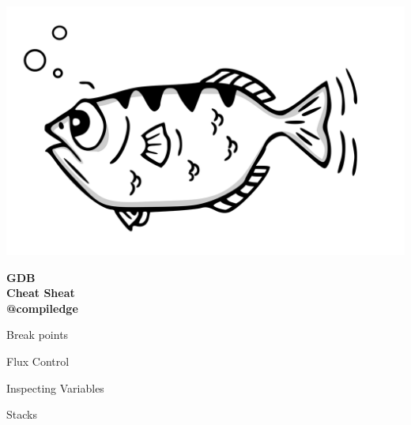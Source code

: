 \documentclass[10pt,landscape,a4paper]{cheatsheet}
\begin{document}
\sffamily
\small
\begin{multicols*}{5}

\includegraphics[scale=0.04]{img/gdb.png}
\vspace{-1.5cm}
\begin{flushright} \bf
GDB \\ Cheat Sheat \\ @compiledge
\end{flushright}
\vspace{-0.25cm}

\begin{obox}{\faStopCircleO}{Break points}
\end{obox}

\begin{gbox}{\faPlayCircle}{Flux Control}
\end{gbox}

\begin{bbox}{\faSearch}{Inspecting Variables}
\end{bbox}

\begin{dbox}{\faSortNumericDesc}{Stacks}
\end{dbox}

\end{multicols*}
\end{document}
